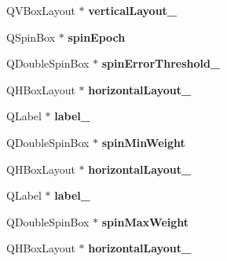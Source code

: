 \begin{DoxyCompactItemize}
\item 
Q\+V\+Box\+Layout $\ast$ {\bfseries vertical\+Layout\+\_}\hypertarget{class_ui___main_form_adb36e71b15d8b22141406e5ba3a8df65}{}\label{class_ui___main_form_adb36e71b15d8b22141406e5ba3a8df65}

\item 
Q\+Spin\+Box $\ast$ {\bfseries spin\+Epoch}\hypertarget{class_ui___main_form_aa8a23ce168990f2cba42ef3af9100d03}{}\label{class_ui___main_form_aa8a23ce168990f2cba42ef3af9100d03}

\item 
Q\+Double\+Spin\+Box $\ast$ {\bfseries spin\+Error\+Threshold\+\_}\hypertarget{class_ui___main_form_a01f029c6308e17dcda63838682d51263}{}\label{class_ui___main_form_a01f029c6308e17dcda63838682d51263}

\item 
Q\+H\+Box\+Layout $\ast$ {\bfseries horizontal\+Layout\+\_}\hypertarget{class_ui___main_form_ab58852651a08a2a629c46a8bc82931b7}{}\label{class_ui___main_form_ab58852651a08a2a629c46a8bc82931b7}

\item 
Q\+Label $\ast$ {\bfseries label\+\_}\hypertarget{class_ui___main_form_a2ac4ca8c6e45d5d372777ab8aea8ba31}{}\label{class_ui___main_form_a2ac4ca8c6e45d5d372777ab8aea8ba31}

\item 
Q\+Double\+Spin\+Box $\ast$ {\bfseries spin\+Min\+Weight}\hypertarget{class_ui___main_form_a17d0fbf6dc50e4c9a7201e93332cabe0}{}\label{class_ui___main_form_a17d0fbf6dc50e4c9a7201e93332cabe0}

\item 
Q\+H\+Box\+Layout $\ast$ {\bfseries horizontal\+Layout\+\_}\hypertarget{class_ui___main_form_a9429ff30cac33b7836df6a0a1b27cd5c}{}\label{class_ui___main_form_a9429ff30cac33b7836df6a0a1b27cd5c}

\item 
Q\+Label $\ast$ {\bfseries label\+\_}\hypertarget{class_ui___main_form_adf9a6c6035fe5a162e6c8e545a0c13e8}{}\label{class_ui___main_form_adf9a6c6035fe5a162e6c8e545a0c13e8}

\item 
Q\+Double\+Spin\+Box $\ast$ {\bfseries spin\+Max\+Weight}\hypertarget{class_ui___main_form_aeeb39938f4e8045fd42e529fded857ff}{}\label{class_ui___main_form_aeeb39938f4e8045fd42e529fded857ff}

\item 
Q\+H\+Box\+Layout $\ast$ {\bfseries horizontal\+Layout\+\_}\hypertarget{class_ui___main_form_a7a9ad98aff2186423dadae1893279e59}{}\label{class_ui___main_form_a7a9ad98aff2186423dadae1893279e59}


\end{DoxyCompactItemize}
